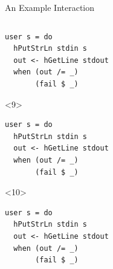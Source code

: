 \documentclass[aspectratio=169]{beamer}
\begin{document}
\begin{frame}[fragile]{An Example Interaction}
\begin{columns}[t]
\begin{column}{0.5\textwidth}
\begin{onlyenv}
\begin{verbatim}
user s = do
  hPutStrLn stdin s
  out <- hGetLine stdout
  when (out /= _)
       (fail $ _)
\end{verbatim}
\end{onlyenv}
\begin{onlyenv}<9>
\begin{verbatim}
user s = do
  hPutStrLn stdin s
  out <- hGetLine stdout
  when (out /= _)
       (fail $ _)
\end{verbatim}
\end{onlyenv}
\begin{onlyenv}<10>
\begin{verbatim}
user s = do
  hPutStrLn stdin s
  out <- hGetLine stdout
  when (out /= _)
       (fail $ _)
\end{verbatim}
\end{onlyenv}
    \end{column}
  \end{columns}
\end{frame}






\end{document}
